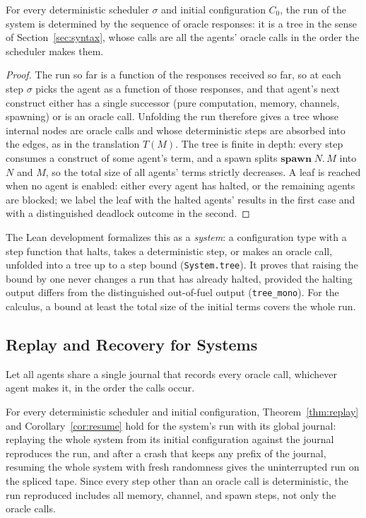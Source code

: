 \begin{lemma}
\label{lem:sys-tree}
For every deterministic scheduler $\sigma$ and initial configuration $C_0$, the run of the
system is determined by the sequence of oracle responses: it is a tree in the sense of
Section~\ref{sec:syntax}, whose calls are all the agents' oracle calls in the order the
scheduler makes them.
\end{lemma}

\begin{proof}
The run so far is a function of the responses received so far, so at each step $\sigma$ picks
the agent as a function of those responses, and that agent's next construct either has a single
successor (pure computation, memory, channels, spawning) or is an oracle call.
Unfolding the run therefore gives a tree whose internal nodes are oracle calls and whose
deterministic steps are absorbed into the edges, as in the translation $T(M)$.
The tree is finite in depth: every step consumes a construct of some agent's term, and a spawn
splits $\mathbf{spawn}\;N.\,M$ into $N$ and $M$, so the total size of all agents' terms strictly
decreases.
A leaf is reached when no agent is enabled: either every agent has halted, or the remaining
agents are blocked; we label the leaf with the halted agents' results in the first case and
with a distinguished deadlock outcome in the second.
\end{proof}

\noindent
The Lean development formalizes this as a \emph{system}: a configuration type with a step
function that halts, takes a deterministic step, or makes an oracle call, unfolded into a tree
up to a step bound (\texttt{System.tree}).
It proves that raising the bound by one never changes a run that has already halted, provided
the halting output differs from the distinguished out-of-fuel output (\texttt{tree\_mono}).
For the calculus, a bound at least the total size of the initial terms covers the whole run.

\subsection{Replay and Recovery for Systems}
\label{sec:sys-replay}

Let all agents share a single journal that records every oracle call, whichever agent makes
it, in the order the calls occur.

\begin{theorem}
\label{thm:sys}
For every deterministic scheduler and initial configuration, Theorem~\ref{thm:replay} and
Corollary~\ref{cor:resume} hold for the system's run with its global journal: replaying the
whole system from its initial configuration against the journal reproduces the run, and after
a crash that keeps any prefix of the journal, resuming the whole system with fresh randomness
gives the uninterrupted run on the spliced tape.
Since every step other than an oracle call is deterministic, the run reproduced includes all
memory, channel, and spawn steps, not only the oracle calls.
\end{theorem}

